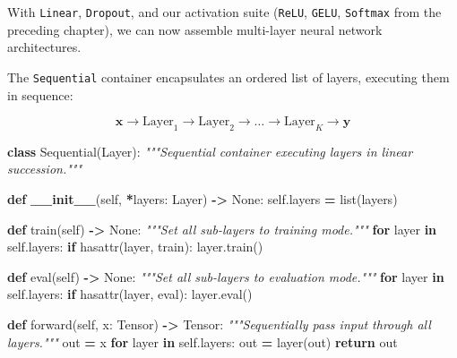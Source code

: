 \documentclass[
  letterpaper,
]{scrbook}
\newenvironment{Shaded}{\begin{snugshade}}{\end{snugshade}}
\newcommand{\BuiltInTok}[1]{#1}
\newcommand{\CommentTok}[1]{\textcolor[rgb]{0.56,0.35,0.01}{\textit{#1}}}
\newcommand{\ControlFlowTok}[1]{\textcolor[rgb]{0.13,0.29,0.53}{\textbf{#1}}}
\newcommand{\FunctionTok}[1]{\textcolor[rgb]{0.13,0.29,0.53}{\textbf{#1}}}
\newcommand{\KeywordTok}[1]{\textcolor[rgb]{0.13,0.29,0.53}{\textbf{#1}}}
\newcommand{\NormalTok}[1]{#1}
\newcommand{\OperatorTok}[1]{\textcolor[rgb]{0.81,0.36,0.00}{\textbf{#1}}}
\newcommand{\StringTok}[1]{\textcolor[rgb]{0.31,0.60,0.02}{#1}}
\newcommand{\VariableTok}[1]{\textcolor[rgb]{0.00,0.00,0.00}{#1}}
\begin{document}
With \texttt{Linear}, \texttt{Dropout}, and our activation suite
(\texttt{ReLU}, \texttt{GELU}, \texttt{Softmax} from the preceding
chapter), we can now assemble multi-layer neural network architectures.

The \texttt{Sequential} container encapsulates an ordered list of
layers, executing them in sequence:

\[\mathbf{x} \longrightarrow \text{Layer}_1 \longrightarrow \text{Layer}_2 \longrightarrow \dots \longrightarrow \text{Layer}_K \longrightarrow \mathbf{y}\]

\begin{Shaded}
\begin{Highlighting}[]
\KeywordTok{class}\NormalTok{ Sequential(Layer):}
    \CommentTok{"""Sequential container executing layers in linear succession."""}

    \KeywordTok{def} \FunctionTok{\_\_init\_\_}\NormalTok{(}\VariableTok{self}\NormalTok{, }\OperatorTok{*}\NormalTok{layers: Layer) }\OperatorTok{{-}\textgreater{}} \VariableTok{None}\NormalTok{:}
        \VariableTok{self}\NormalTok{.layers }\OperatorTok{=} \BuiltInTok{list}\NormalTok{(layers)}

    \KeywordTok{def}\NormalTok{ train(}\VariableTok{self}\NormalTok{) }\OperatorTok{{-}\textgreater{}} \VariableTok{None}\NormalTok{:}
        \CommentTok{"""Set all sub{-}layers to training mode."""}
        \ControlFlowTok{for}\NormalTok{ layer }\KeywordTok{in} \VariableTok{self}\NormalTok{.layers:}
            \ControlFlowTok{if} \BuiltInTok{hasattr}\NormalTok{(layer, }\StringTok{\textquotesingle{}train\textquotesingle{}}\NormalTok{):}
\NormalTok{                layer.train()}

    \KeywordTok{def} \BuiltInTok{eval}\NormalTok{(}\VariableTok{self}\NormalTok{) }\OperatorTok{{-}\textgreater{}} \VariableTok{None}\NormalTok{:}
        \CommentTok{"""Set all sub{-}layers to evaluation mode."""}
        \ControlFlowTok{for}\NormalTok{ layer }\KeywordTok{in} \VariableTok{self}\NormalTok{.layers:}
            \ControlFlowTok{if} \BuiltInTok{hasattr}\NormalTok{(layer, }\StringTok{\textquotesingle{}eval\textquotesingle{}}\NormalTok{):}
\NormalTok{                layer.}\BuiltInTok{eval}\NormalTok{()}

    \KeywordTok{def}\NormalTok{ forward(}\VariableTok{self}\NormalTok{, x: Tensor) }\OperatorTok{{-}\textgreater{}}\NormalTok{ Tensor:}
        \CommentTok{"""Sequentially pass input through all layers."""}
\NormalTok{        out }\OperatorTok{=}\NormalTok{ x}
        \ControlFlowTok{for}\NormalTok{ layer }\KeywordTok{in} \VariableTok{self}\NormalTok{.layers:}
\NormalTok{            out }\OperatorTok{=}\NormalTok{ layer(out)}
        \ControlFlowTok{return}\NormalTok{ out}


\end{Highlighting}
\end{Shaded}
\end{document}
